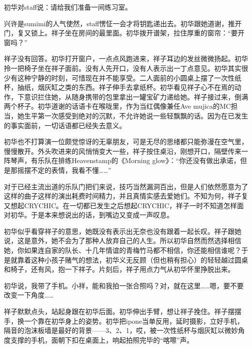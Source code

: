 \documentclass{article}
\begin{document}
初华对staff说：请给我们准备一间练习室。



兴许是sumimi的人气使然，staff愣怔一会才将钥匙递出去。初华跟她道谢，推开门，复又锁上。祥子坐在房间的最里面。初华拨开谱架，拉住厚重的窗帘：“要开窗吗？”



祥子没有回答。初华打开窗户，一点点风跑进来，祥子耳边的发丝微微扬起。初华拎一把椅子坐在祥子面前。没有人先开口，没有人表示出一丁点意见。初华其实很少有这种宁静的时刻，可惜现在并不能享受。二人面前的小圆桌上摆了一次性纸杯，抽纸，烟灰缸之类的东西。祥子伸手去拿纸杯。初华看见祥子心不在焉的动作，下意识拦住她，从随身携带的包里拿出一罐宝矿力递给她。祥子接过来，倒满两个杯子。初华道谢的话语卡在喉咙里，作为当红偶像兼任Ave mujica的MC担当，她生平第一次感受到绝对的沉默，不允许她说一些轻飘飘的话。因为在已发生的事实面前，一切话语都已经失去意义。



初华也不打算演一位颇觉惊讶的无辜朋友，可是无尽的思绪都只能弥漫在空气里，慢慢散开。外头吹进来的风悄悄变大一些，祥子按住桌沿，刚想开口，隔壁传来一阵琴声，有乐队在排练Heavenstamp的《Morning glow》：“你还没有做出承诺，但是那摇摆不定的表情，我看不懂……”



对于已经主流出道的乐队门把们来说，技巧当然漏洞百出，但是人们依然愿意为了这样的曲子这样的演出耗费时间精力，并且真情实感去爱她们。不知为何，祥子复又想起CRYCHIC。在一切都已发生之后想起CRYCHIC，祥子一时不知道怎样面对初华。于是本来想说出的话，到嘴边又变成一声叹息。



初华似乎看穿祥子的意思，她既没有表示出无奈也没有跟着一起长叹。祥子跟她说，这是意外，她不会为了那种人放弃自己的人生。所以初华自然而然选择相信她，你如果连自家的队长、十几年情谊的青梅竹马都不相信，你还能相信谁呢？于是就靠着这种小孩子赌气的想法，初华义无反顾（但也稍有担心）的轻轻越过圆桌和椅子，还有风，抱一下祥子。片刻后，祥子用点力气从初华怀里挣脱出来。



初华说，我带了手机。小祥，能和我拍一张合照吗？对，就在这里……嗯，要不要改变一下角度……



祥子默默点头，站起身跟在初华后面。初华伸出手臂，想让祥子挽住。祥子摆摆手，换一个靠在初华身上的姿势。初华把ipone当单反用，延时摄影，立好手机，隔音的泡沫板墙是最好的背景——3、2、1，哎，被一次性纸杯与烟灰缸以微妙角度支撑的手机，面朝下扣在桌面上，响起拍照完毕的“喀嚓”声。
\end{document}
